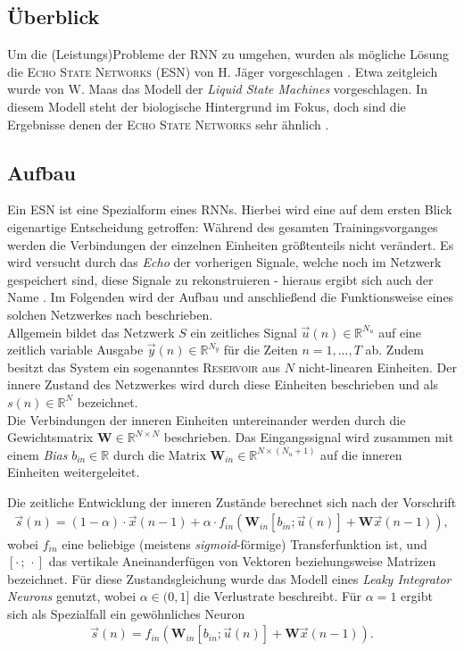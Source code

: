 \subsection{Überblick}
Um die (Leistungs)Probleme der \textsc{RNN} zu umgehen, wurden als mögliche Lösung die \textsc{Echo State Networks} (\textsc{ESN}) von H. Jäger vorgeschlagen \cite{jaeger2010}. Etwa zeitgleich wurde von W. Maas das Modell der \textit{Liquid State Machines} vorgeschlagen. In diesem Modell steht der biologische Hintergrund im Fokus, doch sind die Ergebnisse denen der \textsc{Echo State Networks} sehr ähnlich \citep{Maass2011}. 

\subsection{Aufbau}
Ein \textsc{ESN} ist eine Spezialform eines \textsc{RNN}s. Hierbei wird eine auf dem ersten Blick eigenartige Entscheidung getroffen: Während des gesamten Trainingsvorganges werden die Verbindungen der einzelnen Einheiten größtenteils nicht verändert. Es wird versucht durch das \textit{Echo} der vorherigen Signale, welche noch im Netzwerk gespeichert sind, diese Signale zu rekonstruieren - hieraus ergibt sich auch der Name \cite{lukoseviciusa2009}. Im Folgenden wird der Aufbau und anschließend die Funktionsweise eines solchen Netzwerkes nach \citep{jaeger2007} beschrieben.\\

Allgemein bildet das Netzwerk $S$ ein zeitliches Signal $\vec{u}(n) \in \mathbb{R}^{N_u}$  auf eine zeitlich variable Ausgabe $\vec{y}(n) \in \mathbb{R}^{N_y}$ für die Zeiten $n=1, ..., T$ ab. Zudem besitzt das System ein sogenanntes \textsc{Reservoir} aus $N$ nicht-linearen Einheiten. Der innere Zustand des Netzwerkes wird durch diese Einheiten beschrieben und als $s(n) \in \mathbb{R}^{N}$ bezeichnet.\\
Die Verbindungen der inneren Einheiten untereinander werden durch die Gewichtsmatrix $\mathbf{W} \in \mathbb{R}^{N \times N}$ beschrieben. Das Eingangssignal wird zusammen mit einem \textit{Bias} $b_{in} \in \mathbb{R}$ durch die Matrix $\mathbf{W}_{in} \in \mathbb{R}^{N \times (N_u+1)}$ auf die inneren Einheiten weitergeleitet.

Die zeitliche Entwicklung der inneren Zustände berechnet sich nach der Vorschrift
\begin{align}
\label{eq:esn_stateeq}
\vec{s}(n) = (1 - \alpha) \cdot \vec{x}(n-1)  + \alpha \cdot f_{in}\left( \mathbf{W}_{in} [b_{in}; \vec{u}(n)] + \mathbf{W} \vec{x}(n-1) \right),
\end{align}
wobei $f_{in}$ eine beliebige (meistens \textit{sigmoid}-förmige) Transferfunktion ist, und $[\cdot\,;\,\cdot]$ das vertikale Aneinanderfügen von Vektoren beziehungsweise Matrizen bezeichnet. Für diese Zustandsgleichung wurde das Modell eines \textit{Leaky Integrator Neurons} genutzt, wobei $\alpha \in (0,1]$ die Verlustrate beschreibt. Für $\alpha=1$ ergibt sich als Spezialfall ein gewöhnliches Neuron
\begin{align}
\vec{s}(n) = f_{in}\left( \mathbf{W}_{in} [b_{in}; \vec{u}(n)] + \mathbf{W} \vec{x}(n-1) \right).
\end{align}

